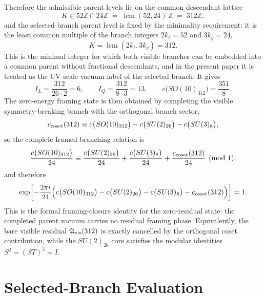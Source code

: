 \documentclass[11pt]{article}
\begin{document}
Therefore the admissible parent levels lie on the common descendant lattice
\begin{equation}
K\in 52\mathbb Z\cap24\mathbb Z
\;=\;
\operatorname{lcm}(52,24)\,\mathbb Z
\;=\;
312\mathbb Z,
\end{equation}
and the selected-branch parent level is fixed by the minimality requirement: it is the least common multiple of the branch integers $2k_{\ell}=52$ and $3k_q=24$,
\begin{equation}
 \boxed{K=\operatorname{lcm}(2k_{\ell},3k_q)=312.}
\end{equation}
This is the minimal integer for which both visible branches can be embedded into a common parent without fractional descendants, and in the present paper it is treated as the UV-scale vacuum label of the selected branch. It gives
\begin{equation}
 I_L = \frac{312}{26\cdot2}=6,
 \qquad
 I_Q = \frac{312}{8\cdot3}=13,
 \qquad
 c\bigl(SO(10)_{312}\bigr)=\frac{351}{8}.
\end{equation}
The zero-energy framing state is then obtained by completing the visible symmetry-breaking branch with the orthogonal branch sector,
\begin{equation}
 c_{\rm coset}(312)
 \equiv
 c\bigl(SO(10)_{312}\bigr)-c\bigl(SU(2)_{26}\bigr)-c\bigl(SU(3)_8\bigr),
\end{equation}
so the complete framed branching relation is
\begin{equation}
 \frac{c\bigl(SO(10)_{312}\bigr)}{24}
 \equiv
 \frac{c\bigl(SU(2)_{26}\bigr)}{24}
 + \frac{c\bigl(SU(3)_8\bigr)}{24}
 + \frac{c_{\rm coset}(312)}{24}
 \pmod 1,
\end{equation}
and therefore
\begin{equation}
 \exp\!\left[-\frac{2\pi i}{24}
 \Bigl(c\bigl(SO(10)_{312}\bigr)-c\bigl(SU(2)_{26}\bigr)-c\bigl(SU(3)_8\bigr)-c_{\rm coset}(312)\Bigr)\right]=1.
\end{equation}
This is the formal framing-closure identity for the zero-residual state: the completed parent vacuum carries no residual framing phase. Equivalently, the bare visible residual $\mathfrak A_{\rm vis}(312)$ is exactly cancelled by the orthogonal coset contribution, while the $SU(2)_{26}$ core satisfies the modular identities $S^2=(ST)^3=I$.

\section{Selected-Branch Evaluation}
\end{document}
